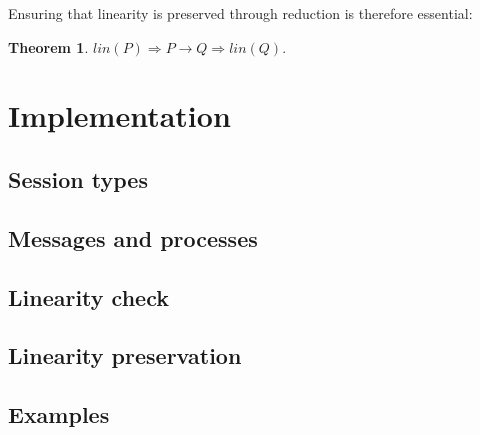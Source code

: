 \documentclass{mproj}
\newtheorem{theorem}{Theorem}
\begin{document}
Ensuring that linearity is preserved through reduction is therefore essential:
\begin{theorem}
    $lin(P) \Rightarrow P \rightarrow Q \Rightarrow lin(Q).$
\end{theorem}

\chapter{Implementation}\label{implementation}

\section{Session types}

\section{Messages and processes}\label{processes}

\section{Linearity check}\label{linearity-check}

\section{Linearity preservation}\label{linearity-preservation}

\section{Examples}\label{examples}
\end{document}
